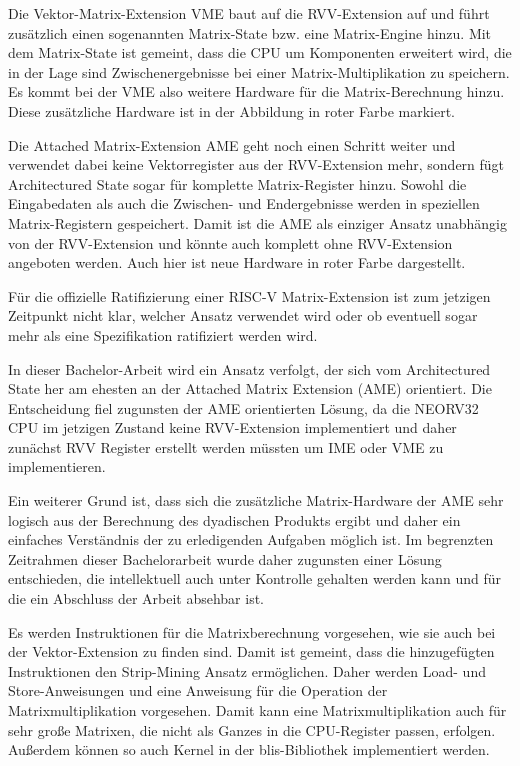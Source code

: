 Die Vektor-Matrix-Extension \gls{VME} baut auf die \gls{RVV}-Extension auf und führt zusätzlich einen sogenannten Matrix-State bzw. eine Matrix-Engine hinzu. Mit dem Matrix-State ist gemeint, dass die CPU um Komponenten erweitert wird, die in der Lage sind Zwischenergebnisse bei einer Matrix-Multiplikation zu speichern. Es kommt bei der \gls{VME} also weitere Hardware für die Matrix-Berechnung hinzu. Diese zusätzliche Hardware ist in der Abbildung \label{fig:Matrix-Extension-Optionen} in roter Farbe markiert.

Die Attached Matrix-Extension \gls{AME} geht noch einen Schritt weiter und verwendet dabei keine Vektorregister aus der \gls{RVV}-Extension mehr, sondern fügt Architectured State sogar für komplette Matrix-Register hinzu. Sowohl die Eingabedaten als auch die Zwischen- und Endergebnisse werden in speziellen Matrix-Registern gespeichert. Damit ist die \gls{AME} als einziger Ansatz unabhängig von der \gls{RVV}-Extension und könnte auch komplett ohne \gls{RVV}-Extension angeboten werden. Auch hier ist neue Hardware in roter Farbe dargestellt.

Für die offizielle Ratifizierung einer RISC-V Matrix-Extension ist zum jetzigen Zeitpunkt nicht klar, welcher Ansatz verwendet wird oder ob eventuell sogar mehr als eine Spezifikation ratifiziert werden wird.

In dieser Bachelor-Arbeit wird ein Ansatz verfolgt, der sich vom Architectured State her am ehesten an der Attached Matrix Extension (\gls{AME}) orientiert. Die Entscheidung fiel zugunsten der \gls{AME} orientierten Lösung, da die NEORV32 CPU im jetzigen Zustand keine \gls{RVV}-Extension implementiert und daher zunächst \gls{RVV} Register erstellt werden müssten um \gls{IME} oder \gls{VME} zu implementieren.

Ein weiterer Grund ist, dass sich die zusätzliche Matrix-Hardware der \gls{AME} sehr logisch aus der Berechnung des dyadischen Produkts ergibt und daher ein einfaches Verständnis der zu erledigenden Aufgaben möglich ist. Im begrenzten Zeitrahmen dieser Bachelorarbeit wurde daher zugunsten einer Lösung entschieden, die intellektuell auch unter Kontrolle gehalten werden kann und für die ein Abschluss der Arbeit absehbar ist.

Es werden Instruktionen für die Matrixberechnung vorgesehen, wie sie auch bei der Vektor-Extension zu finden sind. Damit ist gemeint, dass die hinzugefügten Instruktionen den Strip-Mining Ansatz ermöglichen. Daher werden Load- und Store-Anweisungen und eine Anweisung für die Operation der Matrixmultiplikation vorgesehen. Damit kann eine Matrixmultiplikation auch für sehr große Matrixen, die nicht als Ganzes in die CPU-Register passen, erfolgen. Außerdem können so auch Kernel in der blis-Bibliothek implementiert werden.

